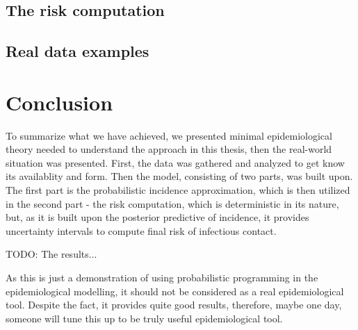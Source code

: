 \documentclass[
  digital, %
  oneside, %
  lof,     %
  lot,     %
]{fithesis4}
\begin{document}


\section{The risk computation}


\section{Real data examples}


\chapter{Conclusion}

To summarize what we have achieved, we presented minimal 
epidemiological theory needed to understand the approach
in this thesis, then the real-world situation was 
presented. First, the data was gathered and analyzed to
get know its availablity and form.
Then the model, consisting of two parts, was built upon.
The first part is the probabilistic incidence approximation, 
which is then utilized in the second part - the risk
computation, which is deterministic in its nature, but,
as it is built upon the posterior predictive of incidence,
it provides uncertainty intervals to compute final risk of
infectious contact.

TODO: The results...

As this is just a demonstration of using probabilistic
programming in the epidemiological modelling, it
should not be considered as a real epidemiological tool.
Despite the fact, it provides quite good results,
therefore, maybe one day, someone will tune this up to
be truly useful epidemiological tool.
\end{document}
